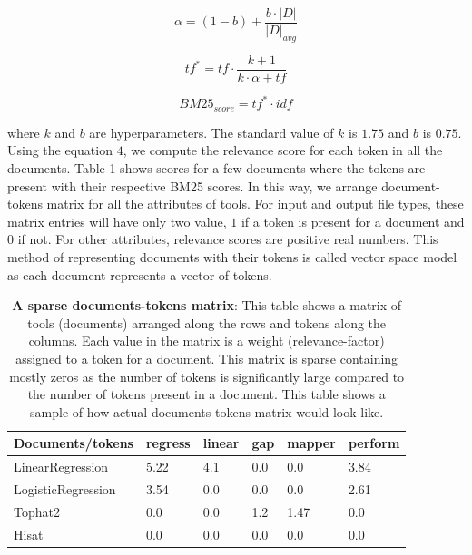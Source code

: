 \begin{equation}
\alpha = (1-b) + \frac{b \cdot |D|}{|D|_{avg}}
\end{equation}

\begin{equation}
tf^* = tf \cdot \frac{k+1}{k \cdot \alpha + tf}
\end{equation}

\begin{equation}
BM25_{score} =tf^* \cdot idf
\end{equation}

where $k$ and $b$ are hyperparameters. The standard value of $k$ is $1.75$ and $b$ is $0.75$. Using the equation $4$, we compute the relevance score for each token in all the documents. Table 1 shows scores for a few documents where the tokens are present with their respective BM25 scores. In this way, we arrange document-tokens matrix for all the attributes of tools. For input and output file types, these matrix entries will have only two value, $1$ if a token is present for a document and $0$ if not. For other attributes, relevance scores are positive real numbers. This method of representing documents with their tokens is called vector space model as each document represents a vector of tokens.

\begin{table}[ht]
\begin{center}
    \begin{tabular}{|l|l|l|l|l|l|}
        \hline
        Documents/tokens   & regress & linear & gap & mapper & perform \\ \hline
        LinearRegression   & 5.22 & 4.1 & 0.0 & 0.0  & 3.84 \\ \hline
        LogisticRegression & 3.54 & 0.0 & 0.0 & 0.0  & 2.61 \\ \hline
        Tophat2            & 0.0  & 0.0 & 1.2 & 1.47 & 0.0 \\ \hline
        Hisat              & 0.0  & 0.0 & 0.0 & 0.0  & 0.0 \\ \hline
    \end{tabular}
    \end{center}
    \caption[A sparse documents-tokens matrix]{\textbf{A sparse documents-tokens matrix}: This table shows a matrix of tools (documents) arranged along the rows and tokens along the columns. Each value in the matrix is a weight (relevance-factor) assigned to a token for a document. This matrix is sparse containing mostly zeros as the number of tokens is significantly large compared to the number of tokens present in a document. This table shows a sample of how actual documents-tokens matrix would look like.}
    \label{tab:accuracy}
\end{table}

